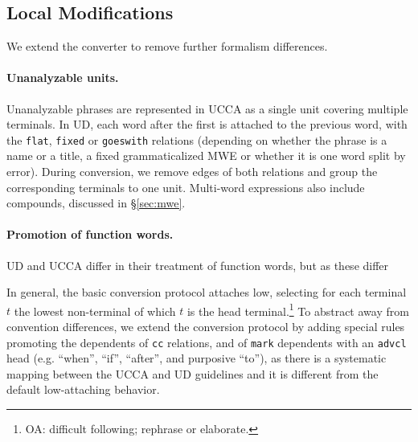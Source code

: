 \documentclass[11pt,a4paper]{article}
\newcommand{\oa}[1]{\footnote{\color{red}OA: #1}}
\begin{document}
\subsection{Local Modifications}\label{sec:local}

We extend the converter to remove further formalism differences.

\paragraph{Unanalyzable units.}
Unanalyzable phrases are represented in UCCA as a single unit covering multiple terminals.
In UD, each word after the first is attached to the previous word,
with the \texttt{flat}, \texttt{fixed} or \texttt{goeswith} relations
(depending on whether the phrase is a name or a title, a fixed grammaticalized MWE
or whether it is one word split by error).
During conversion, we remove edges of both relations and group the corresponding terminals to one unit.
Multi-word expressions also include compounds, discussed in \S\ref{sec:mwe}.

\paragraph{Promotion of function words.}
UD and UCCA differ in their treatment of function words, but as these differ


In general, the basic conversion protocol attaches low,
selecting for each terminal $t$ the lowest non-terminal of which $t$
is the head terminal.\oa{difficult following; rephrase or elaborate.}
To abstract away from convention differences,
we extend the conversion protocol by adding special rules
promoting the dependents of \texttt{cc} relations,
and of \texttt{mark} dependents with an \texttt{advcl} head
(e.g. ``when'', ``if'', ``after'', and purposive ``to''),
as there is a systematic mapping between the UCCA and UD guidelines
and it is different from the default low-attaching behavior.
\end{document}
